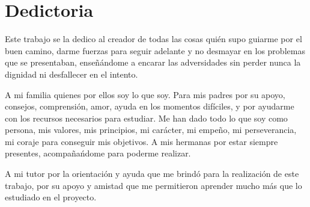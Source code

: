 \chapter*{Dedictoria}
\renewcommand{\footrulewidth}{0.0pt}%
Este trabajo se la dedico al creador de todas las cosas qui\'en supo guiarme por el buen
camino, darme fuerzas para seguir adelante y no desmayar en los
problemas que se presentaban, ense\~n\'andome a encarar las
adversidades sin perder nunca la dignidad ni desfallecer en el
intento.

A mi familia quienes por ellos soy lo que soy.
Para mis padres por su apoyo, consejos, comprensi\'on, amor, ayuda
en los momentos dif\'iciles, y por ayudarme con los recursos necesarios
para estudiar. Me han dado todo lo que soy como persona, mis
valores, mis principios, mi car\'acter, mi empe\~no, mi perseverancia,
mi coraje para conseguir mis objetivos.
A mis hermanas por estar siempre presentes, acompa\~na\'ndome para
poderme realizar. 


A mi tutor por la orientaci\'on y ayuda que me brind\'o para la realizaci\'on de este trabajo, por su apoyo y amistad que me permitieron aprender mucho m\'as que lo estudiado en el proyecto.
